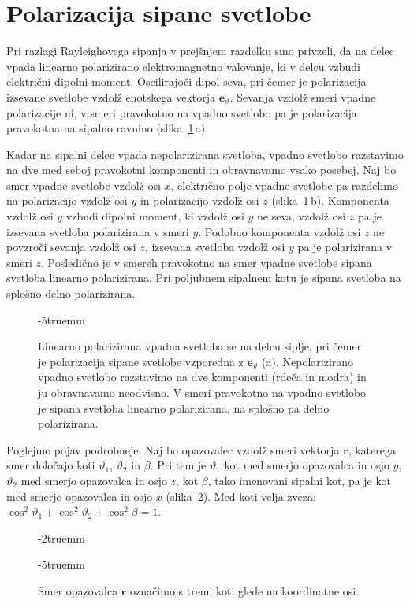 \section{Polarizacija sipane svetlobe}
Pri razlagi Rayleighovega sipanja v prejšnjem razdelku smo privzeli, da na
delec vpada linearno polarizirano elektromagnetno valovanje, ki v delcu vzbudi 
električni dipolni moment. Oscilirajoči dipol seva, pri čemer je polarizacija
izsevane svetlobe vzdolž enotskega vektorja $\mathbf{e}_\vartheta$. Sevanja vzdolž
smeri vpadne polarizacije ni, v smeri pravokotno na vpadno svetlobo pa je polarizacija
pravokotna na sipalno ravnino (slika~\ref{fig:07_pol}\,a).

Kadar na sipalni delec vpada nepolarizirana svetloba, vpadno svetlobo razstavimo
na dve med seboj pravokotni komponenti in obravnavamo vsako posebej. Naj bo smer
vpadne svetlobe vzdolž osi $x$, električno polje vpadne svetlobe pa razdelimo na 
polarizacijo vzdolž osi $y$ in polarizacijo vzdolž osi $z$ (slika~\ref{fig:07_pol}\,b).  
Komponenta vzdolž osi $y$ vzbudi dipolni moment, ki vzdolž osi $y$ 
ne seva, vzdolž osi $z$ pa je izsevana svetloba polarizirana v smeri $y$. 
Podobno komponenta vzdolž osi $z$ ne povzroči sevanja vzdolž osi $z$,
izsevana svetloba vzdolž osi $y$ pa je polarizirana v smeri $z$. Posledično je v smereh
pravokotno na smer vpadne svetlobe sipana svetloba linearno polarizirana. 
Pri poljubnem sipalnem kotu je sipana svetloba na splošno delno polarizirana.
\begin{figure}[!ht]
\centering
\def\svgwidth{135truemm} 

\caption{Linearno polarizirana vpadna svetloba se na delcu siplje, pri čemer je polarizacija
sipane svetlobe vzporedna z $\mathbf{e}_\vartheta$ (a). Nepolarizirano vpadno svetlobo
razstavimo na dve komponenti (rdeča in modra) in ju obravnavamo neodvisno. 
V smeri pravokotno na vpadno svetlobo je sipana svetloba linearno polarizirana, na splošno
pa delno polarizirana.}
\label{fig:07_pol}
\vglue-5truemm
\end{figure}

Poglejmo pojav podrobneje. Naj bo opazovalec vzdolž smeri vektorja $\mathbf{r}$, katerega
smer določajo koti $\vartheta_1$, $\vartheta_2$ in $\beta$. Pri tem je $\vartheta_1$ 
kot med smerjo opazovalca in osjo $y$, $\vartheta_2$ med smerjo opazovalca in 
osjo $z$, kot $\beta$, tako imenovani sipalni kot, pa je kot med smerjo opazovalca 
in osjo $x$ (slika~\ref{fig:07_smernikoti}). Med koti velja
zveza: $\cos^2 \vartheta_1 + \cos^2 \vartheta_2 + \cos^2 \beta = 1$.
\begin{figure}[!ht]
\vglue-2truemm
\centering
\def\svgwidth{50truemm} 

\caption{Smer opazovalca $\mathbf{r}$ označimo s tremi koti glede na koordinatne osi.}
\label{fig:07_smernikoti}
\vglue-5truemm
\end{figure}

